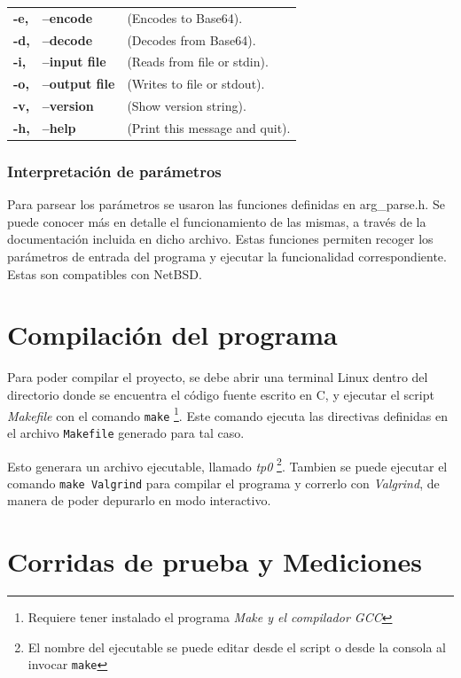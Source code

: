 \documentclass[a4paper,10pt,oneside]{article}
\begin{document}
\begin{ttfamily}
\begin{tabular}{lll}

\bf{-e,} & \bf{--encode} &(Encodes to Base64). \\
\bf{-d,} & \bf{--decode} &(Decodes from Base64).\\
\bf{-i,} & \bf{--input file} &(Reads from file or stdin).\\
\bf{-o,} & \bf{--output file} &(Writes to file or stdout).\\
\bf{-v,} & \bf{--version} 	&(Show version string).\\
\bf{-h,} & \bf{--help} &(Print this message and quit).\\
\end{tabular}
\end{ttfamily}

\subsubsection{Interpretación de parámetros}
Para parsear los parámetros se usaron las funciones definidas en arg\_parse.h. Se puede conocer más en detalle el funcionamiento de las mismas, a través de la documentación incluida en dicho archivo. 
		Estas funciones permiten recoger los parámetros de entrada del programa y ejecutar la funcionalidad correspondiente. Estas son compatibles con NetBSD.
			
	\section{Compilación del programa}
	
		Para poder compilar el proyecto, se debe abrir una terminal Linux dentro del directorio donde se encuentra el código 
		fuente escrito en C, y ejecutar el script \textit{Makefile} con el comando \texttt{make} \footnote{Requiere tener instalado el programa \it{Make} y el compilador \it{GCC}}. Este comando ejecuta las directivas definidas en el archivo \texttt{Makefile} generado para tal caso. 
		
		 Esto generara un archivo ejecutable, llamado \textit{tp0} \footnote{El nombre del ejecutable se puede editar desde el script o desde la consola al invocar \texttt{make}}.  Tambien se puede ejecutar el comando \texttt{make Valgrind} para compilar el programa y correrlo con \textit{Valgrind}, de manera de poder depurarlo en modo interactivo.
	
\section{Corridas de prueba y Mediciones}
\end{document}
